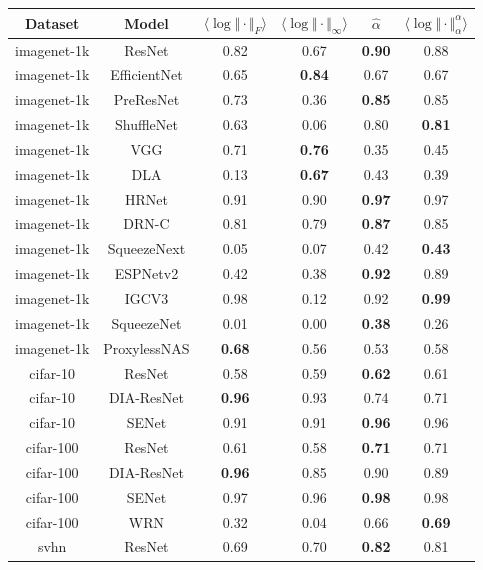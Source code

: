 \begin{table}[t]
\footnotesize  %
\begin{center}
\begin{tabular}{|c|c|c|c|c|c|}
\hline
Dataset & Model  & $\langle\log\Vert\cdot\Vert_{F}\rangle$ & $\langle\log\Vert\cdot\Vert_{\infty}\rangle$ & $\hat{\alpha}$ & $\langle\log\Vert\cdot\Vert^{\alpha}_{\alpha}\rangle$ \\
\hline
imagenet-1k & ResNet  & 0.82 &  0.67 & \textbf{0.90} & 0.88 \\
 imagenet-1k & EfficientNet  & 0.65 &  \textbf{0.84} & 0.67 & 0.67 \\
 imagenet-1k & PreResNet  & 0.73 &  0.36 & \textbf{0.85} & 0.85 \\
 imagenet-1k & ShuffleNet  & 0.63 &  0.06 & 0.80 & \textbf{0.81} \\
 imagenet-1k & VGG  & 0.71 &  \textbf{0.76} & 0.35 & 0.45 \\
 imagenet-1k & DLA  & 0.13 &  \textbf{0.67} & 0.43 & 0.39 \\
 imagenet-1k & HRNet  & 0.91 &  0.90 & \textbf{0.97} & 0.97 \\
 imagenet-1k & DRN-C  & 0.81 &  0.79 & \textbf{0.87} & 0.85 \\
 imagenet-1k & SqueezeNext  & 0.05 &  0.07 & 0.42 & \textbf{0.43} \\
 imagenet-1k & ESPNetv2  & 0.42 &  0.38 & \textbf{0.92} & 0.89 \\
 imagenet-1k & IGCV3  & 0.98 &  0.12 & 0.92 & \textbf{0.99} \\
 imagenet-1k & SqueezeNet  & 0.01 &  0.00 & \textbf{0.38} & 0.26 \\
 imagenet-1k & ProxylessNAS  & \textbf{0.68} &  0.56 & 0.53 & 0.58 \\
\hline
 cifar-10 & ResNet  & 0.58 &  0.59 & \textbf{0.62} & 0.61 \\
 cifar-10 & DIA-ResNet  & \textbf{0.96} &  0.93 & 0.74 & 0.71 \\
 cifar-10 & SENet  & 0.91 &  0.91 & \textbf{0.96} & 0.96 \\
\hline
 cifar-100 & ResNet  & 0.61 &  0.58 & \textbf{0.71} & 0.71 \\
 cifar-100 & DIA-ResNet  & \textbf{0.96} &  0.85 & 0.90 & 0.89 \\
 cifar-100 & SENet  & 0.97 &  0.96 & \textbf{0.98} & 0.98 \\
 cifar-100 & WRN  & 0.32 &  0.04 & 0.66 & \textbf{0.69} \\
\hline
 svhn & ResNet  & 0.69 &  0.70 & \textbf{0.82} & 0.81 \\

\end{tabular}
\end{center}
\end{table}
